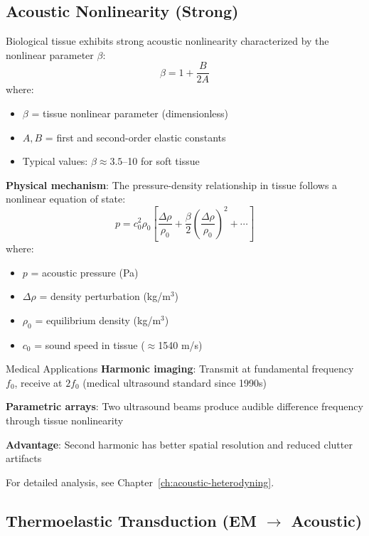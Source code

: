 \subsection{Acoustic Nonlinearity (Strong)}

Biological tissue exhibits strong acoustic nonlinearity characterized by the nonlinear parameter $\beta$:
\begin{equation}
\label{eq:beta-parameter}
\beta = 1 + \frac{B}{2A}
\end{equation}
where:
\begin{itemize}
\item $\beta$ = tissue nonlinear parameter (dimensionless)
\item $A, B$ = first and second-order elastic constants
\item Typical values: $\beta \approx 3.5$--10 for soft tissue
\end{itemize}

\textbf{Physical mechanism}: The pressure-density relationship in tissue follows a nonlinear equation of state:
\begin{equation}
\label{eq:pressure-density}
p = c_0^2 \rho_0 \left[\frac{\Delta\rho}{\rho_0} + \frac{\beta}{2}\left(\frac{\Delta\rho}{\rho_0}\right)^2 + \cdots\right]
\end{equation}
where:
\begin{itemize}
\item $p$ = acoustic pressure (Pa)
\item $\Delta\rho$ = density perturbation (kg/m$^3$)
\item $\rho_0$ = equilibrium density (kg/m$^3$)
\item $c_0$ = sound speed in tissue ($\approx$1540 m/s)
\end{itemize}

\begin{calloutbox}{Medical Applications}
\textbf{Harmonic imaging}: Transmit at fundamental frequency $f_0$, receive at $2f_0$ (medical ultrasound standard since 1990s)

\textbf{Parametric arrays}: Two ultrasound beams produce audible difference frequency through tissue nonlinearity

\textbf{Advantage}: Second harmonic has better spatial resolution and reduced clutter artifacts
\end{calloutbox}

For detailed analysis, see Chapter~\ref{ch:acoustic-heterodyning}.

\subsection{Thermoelastic Transduction (EM $\rightarrow$ Acoustic)}

